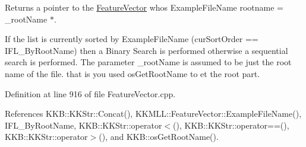 Returns a pointer to the \hyperlink{class_k_k_m_l_l_1_1_feature_vector}{Feature\+Vector} who\textquotesingle{}s Example\+File\+Name rootname = \+\_\+root\+Name $\ast$. 

If the list is currently sorted by Example\+File\+Name (cur\+Sort\+Order == I\+F\+L\+\_\+\+By\+Root\+Name) then a Binary Search is performed otherwise a sequential search is performed. The parameter \+\_\+root\+Name is assumed to be just the root name of the file. that is you used os\+Get\+Root\+Name to et the root part. 

Definition at line 916 of file Feature\+Vector.\+cpp.



References K\+K\+B\+::\+K\+K\+Str\+::\+Concat(), K\+K\+M\+L\+L\+::\+Feature\+Vector\+::\+Example\+File\+Name(), I\+F\+L\+\_\+\+By\+Root\+Name, K\+K\+B\+::\+K\+K\+Str\+::operator$<$(), K\+K\+B\+::\+K\+K\+Str\+::operator==(), K\+K\+B\+::\+K\+K\+Str\+::operator$>$(), and K\+K\+B\+::os\+Get\+Root\+Name().


